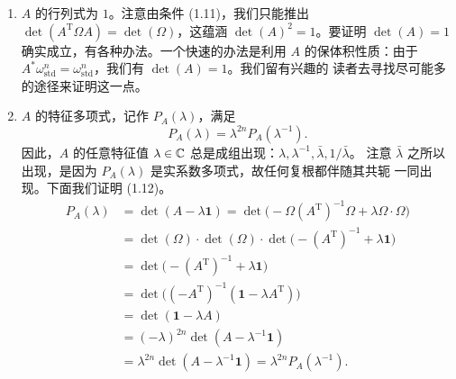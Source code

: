 \begin{enumerate}[label=(\roman*)]
  \item $A$ 的行列式为 $1$。注意由条件 (1.11)，我们只能推出
        $\det(A^{\mathrm T}\Omega A)=\det(\Omega)$，这蕴涵 $\det(A)^2=1$。要证明 $\det(A)=1$
        确实成立，有各种办法。一个快速的办法是利用 $A$ 的保体积性质：由于
        $A^*\omega_{\mathrm{std}}^n=\omega_{\mathrm{std}}^n$，我们有 $\det(A)=1$。我们留有兴趣的
        读者去寻找尽可能多的途径来证明这一点。
  \item $A$ 的特征多项式，记作 $P_A(\lambda)$，满足
    \begin{equation}
      P_A(\lambda)=\lambda^{2n}P_A(\lambda^{-1}).
      \tag{1.12}
    \end{equation}
    因此，$A$ 的任意特征值 $\lambda\in\mathbb{C}$ 总是成组出现：$\lambda,\lambda^{-1},\bar\lambda,1/\bar\lambda$。
    注意 $\bar\lambda$ 之所以出现，是因为 $P_A(\lambda)$ 是实系数多项式，故任何复根都伴随其共轭
    一同出现。下面我们证明 (1.12)。
\[
  \begin{aligned}
    P_A(\lambda)&=\det(A-\lambda\mathbf{1})
      =\det\big(-\Omega(A^{\mathrm T})^{-1}\Omega+\lambda\Omega\cdot\Omega\big)\\
      &=\det(\Omega)\cdot\det(\Omega)\cdot\det\big(-(A^{\mathrm T})^{-1}+\lambda\mathbf{1}\big)\\
      &=\det\big(-(A^{\mathrm T})^{-1}+\lambda\mathbf{1}\big)\\
      &=\det\big((-A^{\mathrm T})^{-1}(\mathbf{1}-\lambda A^{\mathrm T})\big)\\
      &=\det(\mathbf{1}-\lambda A)\\
      &=(-\lambda)^{2n}\det(A-\lambda^{-1}\mathbf{1})\\
      &=\lambda^{2n}\det(A-\lambda^{-1}\mathbf{1})=\lambda^{2n}P_A(\lambda^{-1}).
  \end{aligned}
\]
\end{enumerate}

